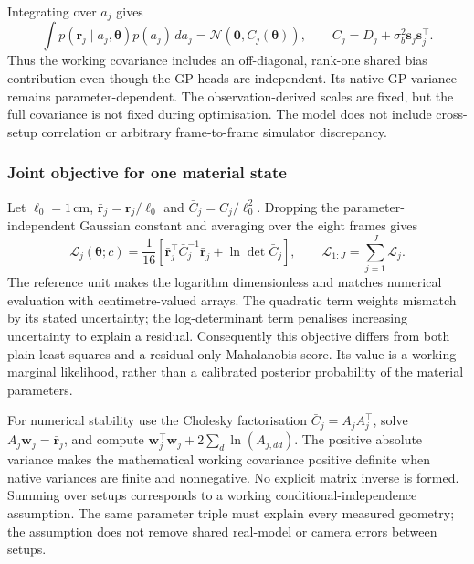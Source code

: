 Integrating over $a_j$ gives
\begin{equation}
\label{eq:inverse-marginal-covariance}
 \int p(\mathbf r_j\mid a_j,\boldsymbol\theta)p(a_j)\,da_j
   =\mathcal N\!\left(\mathbf0,C_j(\boldsymbol\theta)\right),
 \qquad C_j=D_j+\sigma_b^2\mathbf s_j\mathbf s_j^\top.
\end{equation}
Thus the working covariance includes an off-diagonal, rank-one shared
bias contribution even though the GP heads are independent. Its native
GP variance remains parameter-dependent. The observation-derived scales
are fixed, but the full covariance is not fixed during optimisation.
The model does not include cross-setup correlation or arbitrary
frame-to-frame simulator discrepancy.

\subsubsection{Joint objective for one material state}
\label{sec:inv-joint}
Let $\ell_0=1$\,cm, $\bar{\mathbf r}_j=\mathbf r_j/\ell_0$ and
$\bar C_j=C_j/\ell_0^2$. Dropping the parameter-independent Gaussian
constant and averaging over the eight frames gives
\begin{equation}
\label{eq:inverse-marginal-loss}
 \mathcal L_j(\boldsymbol\theta;c)
   =\frac1{16}\left[
    \bar{\mathbf r}_j^\top\bar C_j^{-1}\bar{\mathbf r}_j
      +\ln\det\bar C_j\right],\qquad
 \mathcal L_{1:J}=\sum_{j=1}^{J}\mathcal L_j.
\end{equation}
The reference unit makes the logarithm dimensionless and matches
numerical evaluation with centimetre-valued arrays. The quadratic term
weights mismatch by its stated uncertainty; the log-determinant term
penalises increasing uncertainty to explain a residual. Consequently
this objective differs from both plain least squares and a residual-only
Mahalanobis score. Its value is a working marginal likelihood, rather than
a calibrated posterior probability of the material parameters.

For numerical stability use the Cholesky factorisation
$\bar C_j=A_jA_j^\top$, solve
$A_j\mathbf w_j=\bar{\mathbf r}_j$, and compute
$\mathbf w_j^\top\mathbf w_j+2\sum_d\ln(A_{j,dd})$.
The positive absolute variance makes the mathematical working covariance
positive definite when native variances are finite and nonnegative.
No explicit matrix inverse is formed. Summing over setups corresponds
to a working conditional-independence assumption. The same parameter
triple must explain every measured geometry; the assumption does not
remove shared real-model or camera errors between setups.

